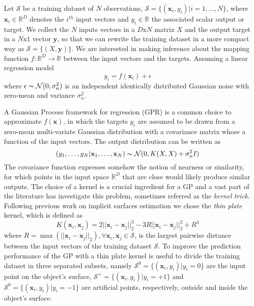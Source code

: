 
Let $\mathcal{S}$ be a training dataset of $N$ observations, $\mathcal{S}=\{(\mathbf{x}_i, y_i)|i=1,\dots,N\}$, where $\mathbf{x}_i\in\mathbb{R}^D$ denotes the $i^{th}$ input vectors and $y_i\in\mathbb{R}$ the associated scalar output or target.  We collect the $N$ inputs vectors in a $D\text{x}N$ matrix $X$ and the output target in a $N\text{x}1$ vector $\mathbf{y}$, so that we can rewrite the training dataset in a more compact way as $\mathcal{S}=\{(X,\mathbf{y})\}$. We are interested in making inference about the mapping function $f:\mathbb{R}^D\rightarrow\mathbb{R}$ between the input vectors and the targets. Assuming a linear regression model
$$
y_i=f(\mathbf{x}_i)+\epsilon
$$
where $\epsilon\thicksim\mathcal{N}(0,\sigma_n^2)$ is an independent identically distributed Gaussian noise with zero-mean and variance $\sigma_n^2$. 

A Gaussian Process framework for regression (GPR) is a common choice to approximate $f(\mathbf{x})$, in which the targets $y_i$ are assumed to be drawn from a zero-mean multi-variate Gaussian distribution with a covariance matrix whose a function of the input vectors. The output distribution can be written as
$$
(y_1,\dots,y_N|\mathbf{x}_1,\dots,\mathbf{x}_N)\thicksim\mathcal{N}(0,K(X,X)+\sigma_n^2I)
$$
The covariance function expresses somehow the notion of nearness or similarity, for which points in the input space $\mathbb{R}^D$ that are close would likely produce similar outputs. The choice of a kernel is a crucial ingredient for a GP and a vast part of the literature has investigate this problem, sometimes referred as the \emph{kernel trick}. Following previous work on implicit surfaces estimation we chose the \emph{thin plate} kernel, which is defined as
$$
K(\mathbf{x}_i,\mathbf{x}_j)=2||\mathbf{x}_i-\mathbf{x}_j||_2^3-3R||\mathbf{x}_i-\mathbf{x}_j||_2^2+R^3
$$
where $R=\max(||\mathbf{x}_i-\mathbf{x}_j||_2),\forall\mathbf{x}_i,\mathbf{x}_j\in\mathcal{S}$, is the largest pairwise distance between the input vectors of the training dataset $\mathcal{S}$. To improve the prediction performance of the GP with a thin plate kernel is useful to divide the training dataset in three separated subsets, namely $\mathcal{S}^0=\{(\mathbf{x}_i,y_i)|y_i=0\}$ are the input point on the object's surface, $\mathcal{S}^+=\{(\mathbf{x}_i,y_i)|y_i=+1\}$ and $\mathcal{S}^0=\{(\mathbf{x}_i,y_i)|y_i=-1\}$ are artificial points, respectively, outside and inside the object's surface. 

